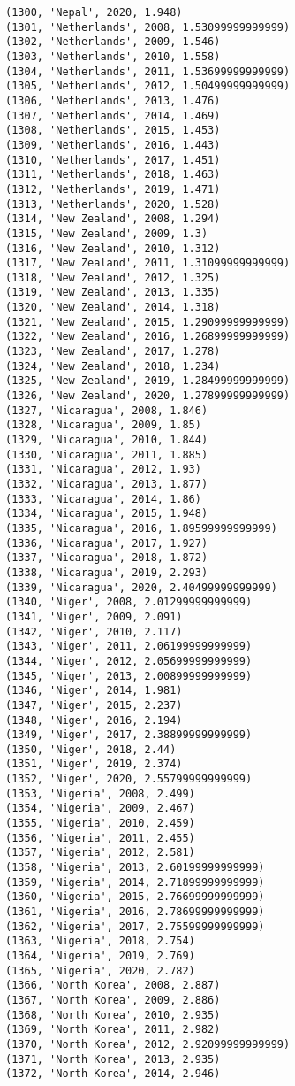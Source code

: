 \documentclass[11pt]{article}
\begin{document}
\begin{Verbatim}[commandchars=\\\{\}]
(1300, 'Nepal', 2020, 1.948)
(1301, 'Netherlands', 2008, 1.53099999999999)
(1302, 'Netherlands', 2009, 1.546)
(1303, 'Netherlands', 2010, 1.558)
(1304, 'Netherlands', 2011, 1.53699999999999)
(1305, 'Netherlands', 2012, 1.50499999999999)
(1306, 'Netherlands', 2013, 1.476)
(1307, 'Netherlands', 2014, 1.469)
(1308, 'Netherlands', 2015, 1.453)
(1309, 'Netherlands', 2016, 1.443)
(1310, 'Netherlands', 2017, 1.451)
(1311, 'Netherlands', 2018, 1.463)
(1312, 'Netherlands', 2019, 1.471)
(1313, 'Netherlands', 2020, 1.528)
(1314, 'New Zealand', 2008, 1.294)
(1315, 'New Zealand', 2009, 1.3)
(1316, 'New Zealand', 2010, 1.312)
(1317, 'New Zealand', 2011, 1.31099999999999)
(1318, 'New Zealand', 2012, 1.325)
(1319, 'New Zealand', 2013, 1.335)
(1320, 'New Zealand', 2014, 1.318)
(1321, 'New Zealand', 2015, 1.29099999999999)
(1322, 'New Zealand', 2016, 1.26899999999999)
(1323, 'New Zealand', 2017, 1.278)
(1324, 'New Zealand', 2018, 1.234)
(1325, 'New Zealand', 2019, 1.28499999999999)
(1326, 'New Zealand', 2020, 1.27899999999999)
(1327, 'Nicaragua', 2008, 1.846)
(1328, 'Nicaragua', 2009, 1.85)
(1329, 'Nicaragua', 2010, 1.844)
(1330, 'Nicaragua', 2011, 1.885)
(1331, 'Nicaragua', 2012, 1.93)
(1332, 'Nicaragua', 2013, 1.877)
(1333, 'Nicaragua', 2014, 1.86)
(1334, 'Nicaragua', 2015, 1.948)
(1335, 'Nicaragua', 2016, 1.89599999999999)
(1336, 'Nicaragua', 2017, 1.927)
(1337, 'Nicaragua', 2018, 1.872)
(1338, 'Nicaragua', 2019, 2.293)
(1339, 'Nicaragua', 2020, 2.40499999999999)
(1340, 'Niger', 2008, 2.01299999999999)
(1341, 'Niger', 2009, 2.091)
(1342, 'Niger', 2010, 2.117)
(1343, 'Niger', 2011, 2.06199999999999)
(1344, 'Niger', 2012, 2.05699999999999)
(1345, 'Niger', 2013, 2.00899999999999)
(1346, 'Niger', 2014, 1.981)
(1347, 'Niger', 2015, 2.237)
(1348, 'Niger', 2016, 2.194)
(1349, 'Niger', 2017, 2.38899999999999)
(1350, 'Niger', 2018, 2.44)
(1351, 'Niger', 2019, 2.374)
(1352, 'Niger', 2020, 2.55799999999999)
(1353, 'Nigeria', 2008, 2.499)
(1354, 'Nigeria', 2009, 2.467)
(1355, 'Nigeria', 2010, 2.459)
(1356, 'Nigeria', 2011, 2.455)
(1357, 'Nigeria', 2012, 2.581)
(1358, 'Nigeria', 2013, 2.60199999999999)
(1359, 'Nigeria', 2014, 2.71899999999999)
(1360, 'Nigeria', 2015, 2.76699999999999)
(1361, 'Nigeria', 2016, 2.78699999999999)
(1362, 'Nigeria', 2017, 2.75599999999999)
(1363, 'Nigeria', 2018, 2.754)
(1364, 'Nigeria', 2019, 2.769)
(1365, 'Nigeria', 2020, 2.782)
(1366, 'North Korea', 2008, 2.887)
(1367, 'North Korea', 2009, 2.886)
(1368, 'North Korea', 2010, 2.935)
(1369, 'North Korea', 2011, 2.982)
(1370, 'North Korea', 2012, 2.92099999999999)
(1371, 'North Korea', 2013, 2.935)
(1372, 'North Korea', 2014, 2.946)

\end{Verbatim}
\end{document}
